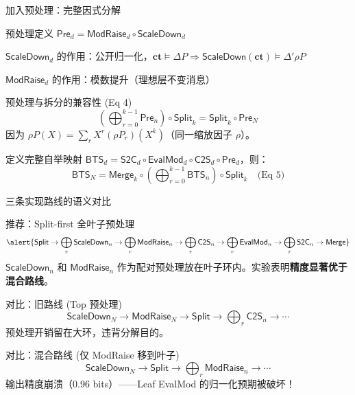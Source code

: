 \documentclass[aspectratio=169, 10pt, xcolor=svgnames, table, UTF8]{ctexbeamer}
\newcommand{\vDashsym}{\mathrel{\vDash}}
\newcommand{\bts}{\mathsf{BTS}}
\newcommand{\cots}{\mathsf{C2S}}
\newcommand{\stoc}{\mathsf{S2C}}
\newcommand{\evalmod}{\mathsf{EvalMod}}
\newcommand{\splitop}{\mathsf{Split}}
\newcommand{\mergeop}{\mathsf{Merge}}
\newcommand{\preop}{\mathsf{Pre}}
\newcommand{\sdop}{\mathsf{ScaleDown}}
\newcommand{\mrop}{\mathsf{ModRaise}}
\begin{document}
\begin{frame}{加入预处理：完整因式分解}
  \begin{block}{预处理定义}
    \(\preop_d = \mrop_d \circ \sdop_d\)
    
    \(\sdop_d\) 的作用：公开归一化，\(\mathbf{ct} \vDashsym \Delta P \Longrightarrow \sdop(\mathbf{ct}) \vDashsym \Delta'\! \rho P\)
    
    \(\mrop_d\) 的作用：模数提升（理想层不变消息）
  \end{block}
  
  \pause
  
  \begin{block}{预处理与拆分的兼容性 (Eq 4)}
    \[
    \boxed{\left(\bigoplus_{r=0}^{k-1} \preop_n\right) \circ \splitop_k = \splitop_k \circ \preop_N}
    \]
    因为 \(\rho P(X) = \sum_r X^r (\rho P_r)(X^k)\)（同一缩放因子 \(\rho\)）。
  \end{block}
  
  \pause
  定义完整自举映射 \(\bts_d = \stoc_d \circ \evalmod_d \circ \cots_d \circ \preop_d\)，则：
  \[
  \boxed{\bts_N = \mergeop_k \circ \left(\bigoplus_{r=0}^{k-1} \bts_n\right) \circ \splitop_k} \quad\text{(Eq 5)}
  \]
\end{frame}

\begin{frame}{三条实现路线的语义对比}
  \begin{block}{推荐：Split-first 全叶子预处理}
    \[
    \alert{\splitop \to \bigoplus_r \sdop_n \to \bigoplus_r \mrop_n \to \bigoplus_r \cots_n \to \bigoplus_r \evalmod_n \to \bigoplus_r \stoc_n \to \mergeop}
    \]
    \(\sdop_n\) 和 \(\mrop_n\) 作为配对预处理放在叶子环内。实验表明\textbf{精度显著优于混合路线}。
  \end{block}
  
  \pause
  
  \begin{block}{对比：旧路线 (Top 预处理)}
    \[
    \sdop_N \to \mrop_N \to \splitop \to \bigoplus_r \cots_n \to \cdots
    \]
    预处理开销留在大环，违背分解目的。
  \end{block}
  
  \begin{block}{对比：混合路线 (仅 ModRaise 移到叶子)}
    \[
    \sdop_N \to \splitop \to \bigoplus_r \mrop_n \to \cdots
    \]
    \alert{输出精度崩溃（0.96 bits）}——Leaf EvalMod 的归一化预期被破坏！
  \end{block}
\end{frame}

\end{document}
